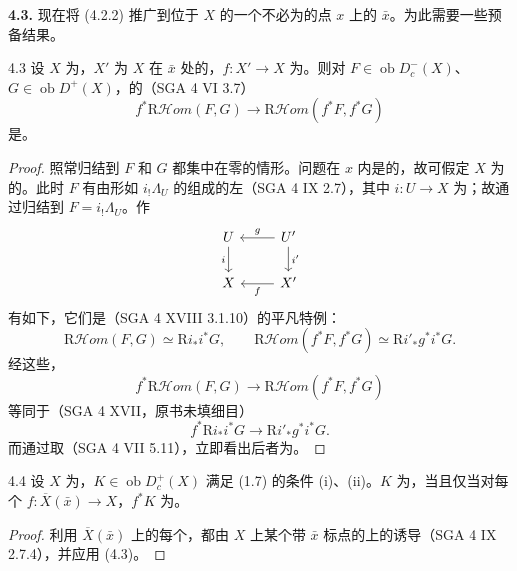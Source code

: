 \textbf{4.3.} 现在将 (4.2.2) 推广到位于 $X$ 的一个不必为的点 $x$ 上的 $\bar x$。为此需要一些预备结果。
\begin{SGAresult}{}{4.3}
设 $X$ 为，$X'$ 为 $X$ 在 $\bar x$ 处的，$f:X'\to X$ 为。则对 $F\in\operatorname{ob}D_c^-(X)$、$G\in\operatorname{ob}D^+(X)$，的（SGA 4 VI 3.7）
\[
f^*\mathrm R\mathscr Hom(F,G)\longrightarrow\mathrm R\mathscr Hom(f^*F,f^*G)
\]
是。
\end{SGAresult}
\begin{proof}
照常归结到 $F$ 和 $G$ 都集中在零的情形。问题在 $x$ 内是的，故可假定 $X$ 为的。此时 $F$ 有由形如 $i_!\Lambda_U$ 的组成的左（SGA 4 IX 2.7），其中 $i:U\to X$ 为；故通过归结到 $F=i_!\Lambda_U$。作
\[
\begin{tikzcd}
U\arrow[d,"i"']&U'\arrow[l,"g"']\arrow[d,"i'"]\\
X&X'\arrow[l,"f"]
\end{tikzcd}
\]
有如下，它们是（SGA 4 XVIII 3.1.10）的平凡特例：
\[
\mathrm R\mathscr Hom(F,G)\simeq\mathrm Ri_*i^*G,\qquad
\mathrm R\mathscr Hom(f^*F,f^*G)\simeq\mathrm Ri'_*g^*i^*G.
\]
经这些，
\[
f^*\mathrm R\mathscr Hom(F,G)\longrightarrow\mathrm R\mathscr Hom(f^*F,f^*G)
\]
等同于（SGA 4 XVII，原书未填细目）
\[f^*\mathrm Ri_*i^*G\longrightarrow\mathrm Ri'_*g^*i^*G.\]
而通过取（SGA 4 VII 5.11），立即看出后者为。
\end{proof}
\begin{SGAresult}{}{4.4}
设 $X$ 为，$K\in\operatorname{ob}D_c^+(X)$ 满足 (1.7) 的条件 (i)、(ii)。$K$ 为，当且仅当对每个 $f:\overline X(\bar x)\to X$，$f^*K$ 为。
\end{SGAresult}
\begin{proof}
利用 $\overline X(\bar x)$ 上的每个，都由 $X$ 上某个带 $\bar x$ 标点的上的诱导（SGA 4 IX 2.7.4），并应用 (4.3)。
\end{proof}
